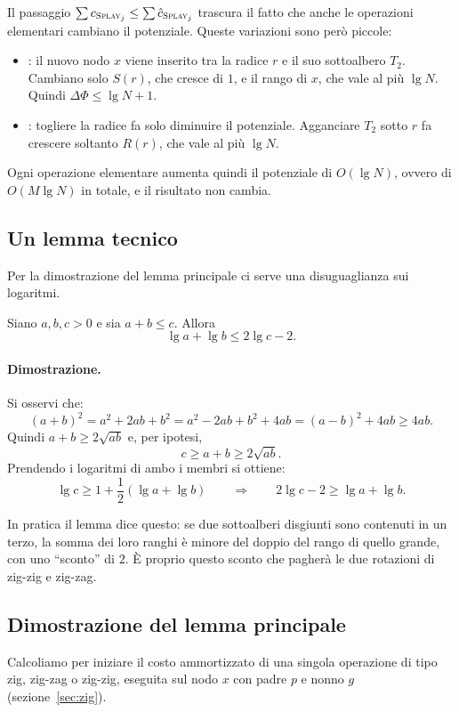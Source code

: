 \begin{osservazione}
Il passaggio $\sum c_{\textsc{Splay}_j} \le \sum \hat{c}_{\textsc{Splay}_j}$ trascura il fatto che anche le operazioni elementari cambiano il potenziale. Queste variazioni sono però piccole:
\begin{itemize}
    \item \textbf{\Insert}: il nuovo nodo $x$ viene inserito tra la radice $r$ e il suo sottoalbero $T_2$. Cambiano solo $S(r)$, che cresce di $1$, e il rango di $x$, che vale al più $\lg N$. Quindi $\Delta\Phi \le \lg N + 1$.
    \item \textbf{\Delete}: togliere la radice fa solo diminuire il potenziale. Agganciare $T_2$ sotto $r$ fa crescere soltanto $R(r)$, che vale al più $\lg N$.
\end{itemize}
Ogni operazione elementare aumenta quindi il potenziale di $O(\lg N)$, ovvero di $O(M \lg N)$ in totale, e il risultato non cambia.
\end{osservazione}

\subsection{Un lemma tecnico}
Per la dimostrazione del lemma principale ci serve una disuguaglianza sui logaritmi.

\begin{lemma}\label{lem:tecnico}
Siano $a, b, c > 0$ e sia $a + b \le c$. Allora
\[
\lg a + \lg b \le 2\lg c - 2.
\]
\end{lemma}

\paragraph{Dimostrazione.}
Si osservi che:
\[
(a+b)^2 = a^2 + 2ab + b^2 = a^2 - 2ab + b^2 + 4ab = (a-b)^2 + 4ab \ge 4ab.
\]
Quindi $a + b \ge 2\sqrt{ab}$ e, per ipotesi,
\[
c \ge a + b \ge 2\sqrt{ab}.
\]
Prendendo i logaritmi di ambo i membri si ottiene:
\[
\lg c \ge 1 + \frac{1}{2}(\lg a + \lg b) \qquad\Longrightarrow\qquad 2\lg c - 2 \ge \lg a + \lg b. \tag*{$\square$}
\]

In pratica il lemma dice questo: se due sottoalberi disgiunti sono contenuti in un terzo, la somma dei loro ranghi è minore del doppio del rango di quello grande, con uno ``sconto'' di $2$. È proprio questo sconto che pagherà le due rotazioni di zig-zig e zig-zag.

\subsection{Dimostrazione del lemma principale}\label{sec:dim-lemma}
Calcoliamo per iniziare il costo ammortizzato di una singola operazione di tipo zig, zig-zag o zig-zig, eseguita sul nodo $x$ con padre $p$ e nonno $g$ (sezione~\ref{sec:zig}).

